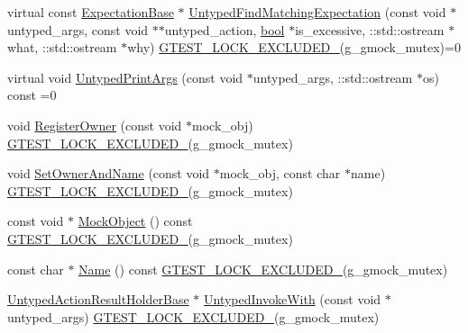 \begin{DoxyCompactItemize}
\item 
virtual const \hyperlink{classtesting_1_1internal_1_1ExpectationBase}{Expectation\+Base} $\ast$ \hyperlink{classtesting_1_1internal_1_1UntypedFunctionMockerBase_a38714b44836c937fe95524f8d7063d04}{Untyped\+Find\+Matching\+Expectation} (const void $\ast$untyped\+\_\+args, const void $\ast$$\ast$untyped\+\_\+action, \hyperlink{classbool}{bool} $\ast$is\+\_\+excessive, \+::std\+::ostream $\ast$what, \+::std\+::ostream $\ast$why) \hyperlink{gtest-port_8h_a69abff5a4efdd07bd5faebe3dd318d06}{G\+T\+E\+S\+T\+\_\+\+L\+O\+C\+K\+\_\+\+E\+X\+C\+L\+U\+D\+E\+D\+\_\+}(g\+\_\+gmock\+\_\+mutex)=0
\item 
virtual void \hyperlink{classtesting_1_1internal_1_1UntypedFunctionMockerBase_ae8c91f05fc90e66a84df49aae8de0d41}{Untyped\+Print\+Args} (const void $\ast$untyped\+\_\+args, \+::std\+::ostream $\ast$os) const =0
\item 
void \hyperlink{classtesting_1_1internal_1_1UntypedFunctionMockerBase_a0cd3dd14b92c714eab690c9597f32ffd}{Register\+Owner} (const void $\ast$mock\+\_\+obj) \hyperlink{gtest-port_8h_a69abff5a4efdd07bd5faebe3dd318d06}{G\+T\+E\+S\+T\+\_\+\+L\+O\+C\+K\+\_\+\+E\+X\+C\+L\+U\+D\+E\+D\+\_\+}(g\+\_\+gmock\+\_\+mutex)
\item 
void \hyperlink{classtesting_1_1internal_1_1UntypedFunctionMockerBase_a287bcacee639b7d123cec29e0614fe96}{Set\+Owner\+And\+Name} (const void $\ast$mock\+\_\+obj, const char $\ast$name) \hyperlink{gtest-port_8h_a69abff5a4efdd07bd5faebe3dd318d06}{G\+T\+E\+S\+T\+\_\+\+L\+O\+C\+K\+\_\+\+E\+X\+C\+L\+U\+D\+E\+D\+\_\+}(g\+\_\+gmock\+\_\+mutex)
\item 
const void $\ast$ \hyperlink{classtesting_1_1internal_1_1UntypedFunctionMockerBase_a71863dd67193a7082078d5b366d5ce51}{Mock\+Object} () const \hyperlink{gtest-port_8h_a69abff5a4efdd07bd5faebe3dd318d06}{G\+T\+E\+S\+T\+\_\+\+L\+O\+C\+K\+\_\+\+E\+X\+C\+L\+U\+D\+E\+D\+\_\+}(g\+\_\+gmock\+\_\+mutex)
\item 
const char $\ast$ \hyperlink{classtesting_1_1internal_1_1UntypedFunctionMockerBase_ae90a5b5d48db1e99634bc6ff39ded335}{Name} () const \hyperlink{gtest-port_8h_a69abff5a4efdd07bd5faebe3dd318d06}{G\+T\+E\+S\+T\+\_\+\+L\+O\+C\+K\+\_\+\+E\+X\+C\+L\+U\+D\+E\+D\+\_\+}(g\+\_\+gmock\+\_\+mutex)
\item 
\hyperlink{classtesting_1_1internal_1_1UntypedActionResultHolderBase}{Untyped\+Action\+Result\+Holder\+Base} $\ast$ \hyperlink{classtesting_1_1internal_1_1UntypedFunctionMockerBase_adaec41c0ba8a07c2415f6c8efa0ca54f}{Untyped\+Invoke\+With} (const void $\ast$untyped\+\_\+args) \hyperlink{gtest-port_8h_a69abff5a4efdd07bd5faebe3dd318d06}{G\+T\+E\+S\+T\+\_\+\+L\+O\+C\+K\+\_\+\+E\+X\+C\+L\+U\+D\+E\+D\+\_\+}(g\+\_\+gmock\+\_\+mutex)
\end{DoxyCompactItemize}
